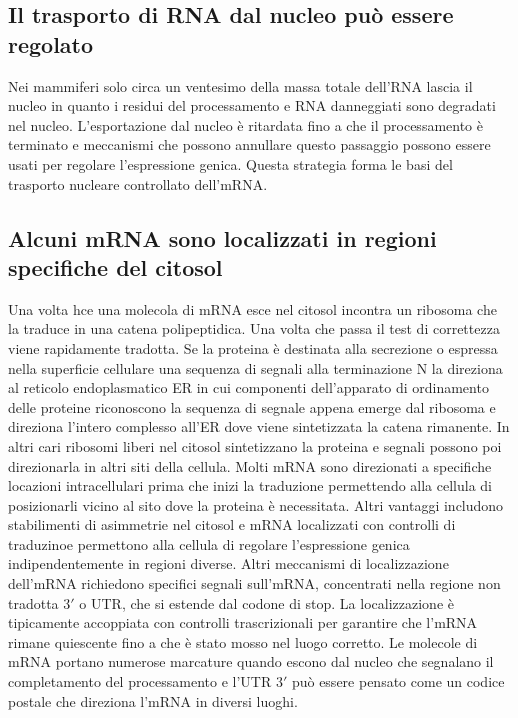 \subsection{Il trasporto di RNA dal nucleo pu\`o essere regolato}
Nei mammiferi solo circa un ventesimo della massa totale dell'RNA lascia il nucleo in quanto i residui del processamento e RNA danneggiati sono degradati nel nucleo. L'esportazione
dal nucleo \`e ritardata fino a che il processamento \`e terminato e meccanismi che possono annullare questo passaggio possono essere usati per regolare l'espressione genica. Questa
strategia forma le basi del trasporto nucleare controllato dell'mRNA.
\subsection{Alcuni mRNA sono localizzati in regioni specifiche del citosol}
Una volta hce una molecola di mRNA esce nel citosol incontra un ribosoma che la traduce in una catena polipeptidica. Una volta che passa il test di correttezza viene rapidamente 
tradotta. Se la proteina \`e destinata alla secrezione o espressa nella superficie cellulare una sequenza di segnali alla terminazione N la direziona al reticolo endoplasmatico ER in 
cui componenti dell'apparato di ordinamento delle proteine riconoscono la sequenza di segnale appena emerge dal ribosoma e direziona l'intero complesso all'ER dove viene sintetizzata
la catena rimanente. In altri cari ribosomi liberi nel citosol sintetizzano la proteina e segnali possono poi direzionarla in altri siti della cellula. Molti mRNA sono direzionati a
specifiche locazioni intracellulari prima che inizi la traduzione permettendo alla cellula di posizionarli vicino al sito dove la proteina \`e necessitata. Altri vantaggi includono
stabilimenti di asimmetrie nel citosol e mRNA localizzati con controlli di traduzinoe permettono alla cellula di regolare l'espressione genica indipendentemente in regioni diverse.
Altri meccanismi di localizzazione dell'mRNA richiedono specifici segnali sull'mRNA, concentrati nella regione non tradotta $3'$ o UTR, che si estende dal codone di stop. La 
localizzazione \`e tipicamente accoppiata con controlli trascrizionali per garantire che l'mRNA rimane quiescente fino a che \`e stato mosso nel luogo corretto. Le molecole di mRNA 
portano numerose marcature quando escono dal nucleo che segnalano il completamento del processamento e l'UTR $3'$ pu\`o essere pensato come un codice postale che direziona l'mRNA in
diversi luoghi. 

